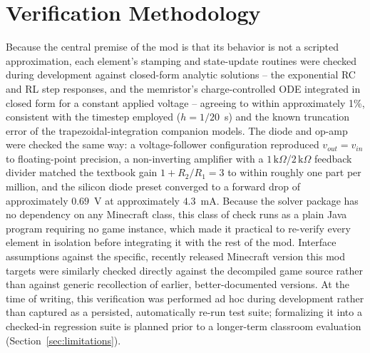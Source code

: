 \section{Verification Methodology}
\label{sec:validation}

Because the central premise of the mod is that its behavior is not a scripted
approximation, each element's stamping and state-update routines were checked during
development against closed-form analytic solutions -- the exponential RC and RL step
responses, and the memristor's charge-controlled ODE integrated in closed form for a
constant applied voltage -- agreeing to within approximately 1\%, consistent with the
timestep employed ($h=1/20$~s) and the known truncation error of the trapezoidal-integration
companion models. The diode and op-amp were checked the same way: a voltage-follower
configuration reproduced $v_{out}=v_{in}$ to floating-point precision, a non-inverting
amplifier with a $1\,\mathrm{k}\Omega$/$2\,\mathrm{k}\Omega$ feedback divider matched the
textbook gain $1+R_2/R_1=3$ to within roughly one part per million, and the silicon diode
preset converged to a forward drop of approximately $0.69$~V at approximately $4.3$~mA.
Because the solver package has no dependency on any Minecraft class, this class of check runs
as a plain Java program requiring no game instance, which made it practical to re-verify every
element in isolation before integrating it with the rest of the mod. Interface assumptions
against the specific, recently released Minecraft version this mod targets were similarly
checked directly against the decompiled game source rather than against generic recollection
of earlier, better-documented versions. At the time of writing, this verification was
performed ad hoc during development rather than captured as a persisted, automatically
re-run test suite; formalizing it into a checked-in regression suite is planned prior to a
longer-term classroom evaluation (Section~\ref{sec:limitations}).

